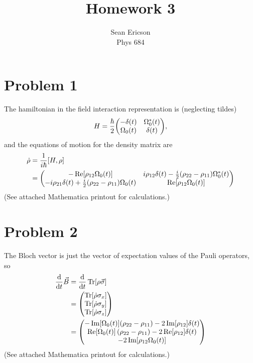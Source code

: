 \documentclass[12pt]{article}
\begin{document}
	
\title{Homework 3}
\author{Sean Ericson \\ Phys 684}
\maketitle

\section*{Problem 1}
The hamiltonian in the field interaction representation is (neglecting tildes)
\[ H = \frac{\hbar}{2}\mqty(-\delta(t)&\Omega_0^*(t)\\\Omega_0(t)&\delta(t)), \]
and the equations of motion for the density matrix are 
\begin{align*}
    \dot{\rho} &= \frac{1}{i\hbar}\comm{H}{\rho} \\
    &= \mqty(-\Re[\rho_{12}\Omega_0(t)]&i\rho_{12}\delta(t) - \frac{i}{2}(\rho_{22}-\rho_{11})\Omega_0^*(t) \\ -i\rho_{21}\delta(t) + \frac{i}{2}(\rho_{22}-\rho_{11})\Omega_0(t) & \Re[\rho_{12}\Omega_0(t)])
\end{align*}
(See attached Mathematica printout for calculations.)

\section*{Problem 2}
The Bloch vector is just the vector of expectation values of the Pauli operators, so
\begin{align*}
    \dv{t}\vec{B} &= \dv{t}\Tr[\rho\vec{\sigma}] \\
    &= \mqty(\Tr[\dot\rho\sigma_x]\\\Tr[\dot\rho\sigma_y]\\\Tr[\dot\rho\sigma_z]) \\
    &= \mqty(-\Im[\Omega _0(t)] (\rho _{22}-\rho _{11}) - 2\Im[\rho_{12}] \delta(t) \\ \Re[\Omega _0(t)] \left(\rho _{22}-\rho _{11}\right) - 2\Re[\rho_{12}] \delta (t) \\ -2\Im[\rho_{12}\Omega_0(t)])
\end{align*}
(See attached Mathematica printout for calculations.)
\end{document}

